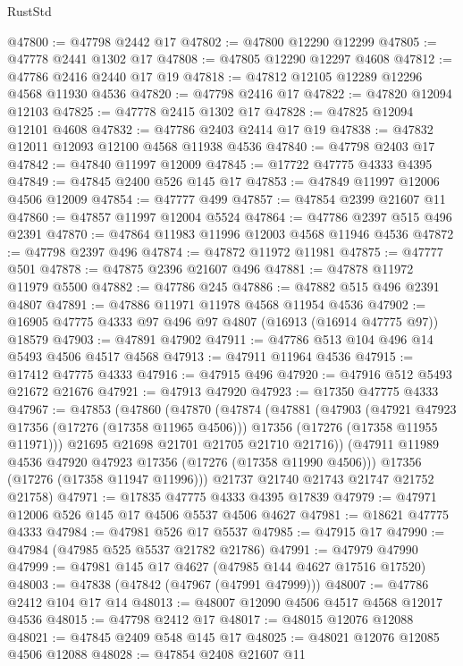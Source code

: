 \begin{lexlean}{RustStd}
\begin{coremodule}
@47800 := @47798 @2442 @17
@47802 := @47800 @12290 @12299
@47805 := @47778 @2441 @1302 @17
@47808 := @47805 @12290 @12297 @4608
@47812 := @47786 @2416 @2440 @17 @19
@47818 := @47812 @12105 @12289 @12296 @4568 @11930 @4536
@47820 := @47798 @2416 @17
@47822 := @47820 @12094 @12103
@47825 := @47778 @2415 @1302 @17
@47828 := @47825 @12094 @12101 @4608
@47832 := @47786 @2403 @2414 @17 @19
@47838 := @47832 @12011 @12093 @12100 @4568 @11938 @4536
@47840 := @47798 @2403 @17
@47842 := @47840 @11997 @12009
@47845 := @17722 @47775 @4333 @4395
@47849 := @47845 @2400 @526 @145 @17
@47853 := @47849 @11997 @12006 @4506 @12009
@47854 := @47777 @499
@47857 := @47854 @2399 @21607 @11
@47860 := @47857 @11997 @12004 @5524
@47864 := @47786 @2397 @515 @496 @2391
@47870 := @47864 @11983 @11996 @12003 @4568 @11946 @4536
@47872 := @47798 @2397 @496
@47874 := @47872 @11972 @11981
@47875 := @47777 @501
@47878 := @47875 @2396 @21607 @496
@47881 := @47878 @11972 @11979 @5500
@47882 := @47786 @245
@47886 := @47882 @515 @496 @2391 @4807
@47891 := @47886 @11971 @11978 @4568 @11954 @4536
@47902 := @16905 @47775 @4333 @97 @496 @97 @4807 (@16913 (@16914 @47775 @97)) @18579
@47903 := @47891 @47902
@47911 := @47786 @513 @104 @496 @14 @5493 @4506 @4517 @4568
@47913 := @47911 @11964 @4536
@47915 := @17412 @47775 @4333
@47916 := @47915 @496
@47920 := @47916 @512 @5493 @21672 @21676
@47921 := @47913 @47920
@47923 := @17350 @47775 @4333
@47967 := @47853
    (@47860
      (@47870
        (@47874
          (@47881
            (@47903
              (@47921 @47923 @17356 (@17276 (@17358 @11965 @4506)))
              @17356
              (@17276 (@17358 @11955 @11971)))
            @21695
            @21698
            @21701
            @21705
            @21710
            @21716))
        (@47911 @11989 @4536 @47920 @47923 @17356 (@17276 (@17358 @11990 @4506)))
        @17356
        (@17276 (@17358 @11947 @11996)))
      @21737
      @21740
      @21743
      @21747
      @21752
      @21758)
@47971 := @17835 @47775 @4333 @4395 @17839
@47979 := @47971 @12006 @526 @145 @17 @4506 @5537 @4506 @4627
@47981 := @18621 @47775 @4333
@47984 := @47981 @526 @17 @5537
@47985 := @47915 @17
@47990 := @47984 (@47985 @525 @5537 @21782 @21786)
@47991 := @47979 @47990
@47999 := @47981 @145 @17 @4627 (@47985 @144 @4627 @17516 @17520)
@48003 := @47838 (@47842 (@47967 (@47991 @47999)))
@48007 := @47786 @2412 @104 @17 @14
@48013 := @48007 @12090 @4506 @4517 @4568 @12017 @4536
@48015 := @47798 @2412 @17
@48017 := @48015 @12076 @12088
@48021 := @47845 @2409 @548 @145 @17
@48025 := @48021 @12076 @12085 @4506 @12088
@48028 := @47854 @2408 @21607 @11

\end{coremodule}
\end{lexlean}
